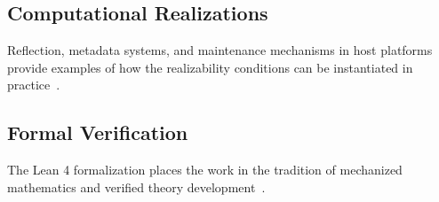 \subsection{Computational Realizations}\label{sec:related-meta}

Reflection, metadata systems, and maintenance mechanisms in host platforms provide examples of how the realizability conditions can be instantiated in practice~\cite{kiczales1991art,smith1984reflection}.

\subsection{Formal Verification}\label{sec:related-formal}

The Lean 4 formalization places the work in the tradition of mechanized mathematics and verified theory development~\cite{demoura2021lean4,leroy2009compcert}.

